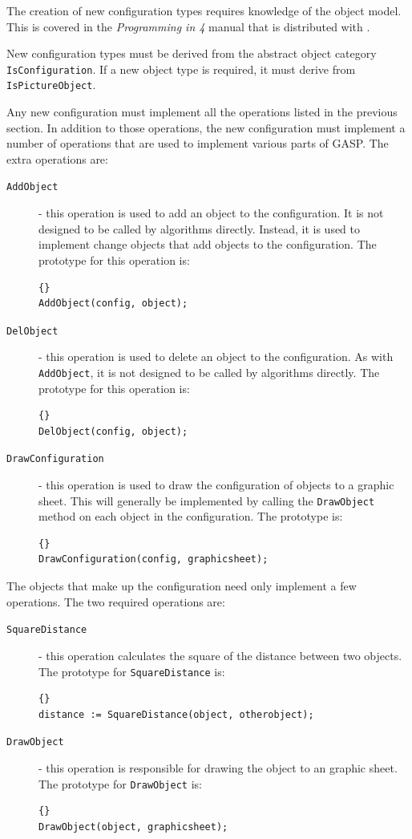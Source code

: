 The creation of new configuration types requires knowledge of the
\GAP{} object model.  This is covered in the \emph{Programming in
\GAP{} 4} manual \cite{gap-prg} that is distributed with \GAP{}.

New configuration types must be derived from the abstract object
category \texttt{IsConfiguration}.  If a new object type is required,
it must derive from \texttt{IsPicture\-Object}.

Any new configuration must implement all the operations listed in the
previous section.  In addition to those operations, the new configuration
must implement a number of operations that are used to implement
various parts of GASP.  The extra operations are:
\begin{description}
\item[\texttt{AddObject}] - this operation is used to add an object to
the configuration.  It is not designed to be called by algorithms
directly.  Instead, it is used to implement change objects that add
objects to the configuration.  The prototype for this operation is:
\begin{lstlisting}{}
AddObject(config, object);
\end{lstlisting}
\item[\texttt{DelObject}] - this operation is used to delete an object
to the configuration.  As with \texttt{AddObject}, it is not designed
to be called by algorithms directly.  The prototype for this operation
is:
\begin{lstlisting}{}
DelObject(config, object);
\end{lstlisting}
\item[\texttt{DrawConfiguration}] - this operation is used to draw the
configuration of objects to a graphic sheet.  This will generally be
implemented by calling the \texttt{DrawObject} method on each object
in the configuration.  The prototype is:
\begin{lstlisting}{}
DrawConfiguration(config, graphicsheet);
\end{lstlisting}
\end{description}

The objects that make up the configuration need only implement a few
operations.  The two required operations are:
\begin{description}
\item[\texttt{SquareDistance}] - this operation calculates the square
of the distance between two objects.  The prototype for
\texttt{Square\-Distance} is:
\begin{lstlisting}{}
distance := SquareDistance(object, otherobject);
\end{lstlisting}
\item[\texttt{DrawObject}] - this operation is responsible for drawing
the object to an \XGAP{} graphic sheet.  The prototype for
\texttt{Draw\-Object} is:
\begin{lstlisting}{}
DrawObject(object, graphicsheet);
\end{lstlisting}
\end{description}

